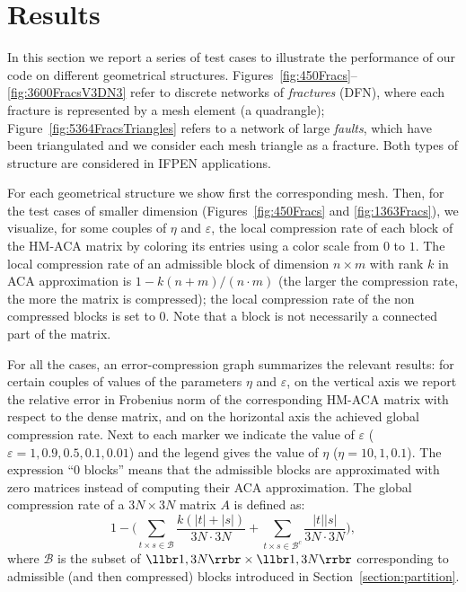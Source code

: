 


\section{Results}
\label{sec:results}

In this section we report a series of test cases to illustrate the performance of our code on different geometrical structures.
Figures~\ref{fig:450Fracs}--\ref{fig:3600FracsV3DN3} refer to discrete networks of \emph{fractures} (DFN), where each fracture is represented by a mesh element (a quadrangle);    
Figure~\ref{fig:5364FracsTriangles} refers to a network of large \emph{faults}, which have been triangulated and we consider each mesh triangle as a fracture. Both types of structure are considered in IFPEN applications.

For each geometrical structure we show first the corresponding mesh.
Then, for the test cases of smaller dimension (Figures~\ref{fig:450Fracs} and \ref{fig:1363Fracs}), we visualize, for some couples of $\eta$ and $\varepsilon$, the local compression rate of each block of the HM-ACA matrix by coloring its entries using a color scale from $0$ to $1$. The local compression rate of an admissible block of dimension $n\times m$ with rank $k$ in ACA approximation is $1-k(n+m)/(n\cdot m)$ (the larger the compression rate, the more the matrix is compressed); the local compression rate of the non compressed blocks is set to $0$. Note that a block is not necessarily a connected part of the matrix.

For all the cases, an error-compression graph summarizes the relevant results: for certain couples of values of the parameters $\eta$ and $\varepsilon$, on the vertical axis we report the relative error in Frobenius norm of the corresponding HM-ACA matrix with respect to the dense matrix, and on the horizontal axis the achieved global compression rate. Next to each marker we indicate the value of $\varepsilon$ ($\varepsilon=1, 0.9, 0.5, 0.1, 0.01$) and the legend gives the value of $\eta$ ($\eta=10,1,0.1$). The expression ``0 blocks'' means that the admissible blocks are approximated with zero matrices instead of computing their ACA approximation.
The global compression rate of a $3N\times 3N$ matrix $A$ is defined as:
\[
1- \Biggl(\sum_{t \times s \in \mathscr{B}}{\frac{k(\lvert t \rvert + \lvert s \rvert)}{3N\cdot3N} } + 
\sum_{t \times s \in \mathscr{B}^c}{\frac{\lvert t \rvert \lvert s \rvert}{3N\cdot3N} } \Biggr),
\]
where $\mathscr{B}$ is the subset of $\llbr 1,3N\rrbr\times \llbr 1,3N\rrbr$ corresponding to admissible (and then compressed) blocks introduced in Section~\ref{section:partition}.

